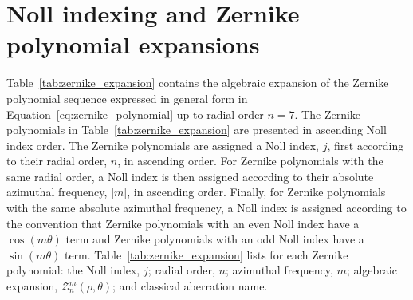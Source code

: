 \chapter{Noll indexing and Zernike polynomial expansions}
\label{app:zernike_expansion}

Table~\ref{tab:zernike_expansion} contains the algebraic expansion of the Zernike polynomial sequence expressed in general form in Equation~\ref{eq:zernike_polynomial} up to radial order $n = 7$. The Zernike polynomials in Table~\ref{tab:zernike_expansion} are presented in ascending Noll index order. The Zernike polynomials are assigned a Noll index, $j$, first according to their radial order, $n$, in ascending order. For Zernike polynomials with the same radial order, a Noll index is then assigned according to their absolute azimuthal frequency, $|m|$, in ascending order. Finally, for Zernike polynomials with the same absolute azimuthal frequency, a Noll index is assigned according to the convention that Zernike polynomials with an even Noll index have a $\cos(m\theta)$ term and Zernike polynomials with an odd Noll index have a $\sin(m\theta)$ term\cite{noll1976zernike}. Table~\ref{tab:zernike_expansion} lists for each Zernike polynomial: the Noll index, $j$; radial order, $n$; azimuthal frequency, $m$; algebraic expansion, $\mathcal{Z}^{m}_{n}\left(\rho,\theta\right)$; and classical aberration name.

